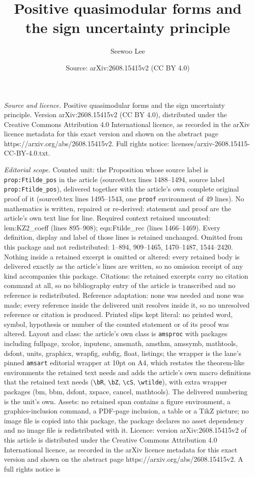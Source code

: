 \documentclass[10pt,a4paper]{amsart}
\title[Positive quasimodular forms and the sign uncertainty princip]{Positive quasimodular forms and the sign uncertainty principle}
\author{Seewoo Lee}
\date{Source: arXiv:2608.15415v2 (CC BY 4.0)}
\begin{document}
\maketitle

\noindent\emph{Source and licence.} Positive quasimodular forms and the sign uncertainty principle. Version arXiv:2608.15415v2 (CC BY 4.0), distributed under the Creative Commons Attribution 4.0 International licence, as recorded in the arXiv licence metadata for this exact version and shown on the abstract page https://arxiv.org/abs/2608.15415v2. Full rights notice: licenses/arxiv-2608.15415-CC-BY-4.0.txt.\par\smallskip

\noindent\textit{Editorial scope.} Counted unit: the Proposition whose source label is \texttt{prop:Ftilde\_pos} in the article (source0.tex lines 1488--1494, source label \texttt{prop:Ftilde\_pos}), delivered together with the article's own complete original proof of it (source0.tex lines 1495--1543, one \texttt{proof} environment of 49 lines). No mathematics is written, repaired or re-derived: statement and proof are the article's own text line for line. Required context retained uncounted: lem:KZ2\_coeff (lines 895--908); eqn:Ftilde\_rec (lines 1466--1469). Every definition, display and label of those lines is retained unchanged. Omitted from this package and not redistributed: 1--894, 909--1465, 1470--1487, 1544--2420. Nothing inside a retained excerpt is omitted or altered: every retained body is delivered exactly as the article's lines are written, so no omission receipt of any kind accompanies this package. Citations: the retained excerpts carry no citation command at all, so no bibliography entry of the article is transcribed and no reference is redistributed. Reference adaptation: none was needed and none was made; every reference inside the delivered unit resolves inside it, so no unresolved reference or citation is produced. Printed slips kept literal: no printed word, symbol, hypothesis or number of the counted statement or of its proof was altered. Layout and class: the article's own class is \texttt{amsproc} with packages including fullpage, xcolor, inputenc, amsmath, amsthm, amssymb, mathtools, dsfont, units, graphicx, wrapfig, subfig, float, listings; the wrapper is the lane's pinned \texttt{amsart} editorial wrapper at 10pt on A4, which restates the theorem-like environments the retained text needs and adds the article's own macro definitions that the retained text needs (\texttt{\textbackslash bR}, \texttt{\textbackslash bZ}, \texttt{\textbackslash cS}, \texttt{\textbackslash wtilde}), with extra wrapper packages (bm, bbm, dsfont, xspace, cancel, mathtools). The delivered numbering is the unit's own. Assets: no retained span contains a figure environment, a graphics-inclusion command, a PDF-page inclusion, a table or a TikZ picture; no image file is copied into this package, the package declares no asset dependency and no image file is redistributed with it. Licence: version arXiv:2608.15415v2 of this article is distributed under the Creative Commons Attribution 4.0 International licence, as recorded in the arXiv licence metadata for this exact version and shown on the abstract page https://arxiv.org/abs/2608.15415v2. A full rights notice is 
\end{document}
